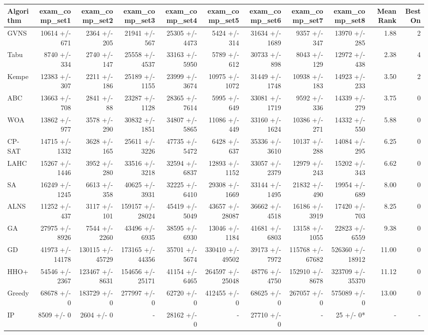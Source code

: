 \begin{tabular}{lrrrrrrrrrr}
\toprule
Algorithm & exam\_comp\_set1 & exam\_comp\_set2 & exam\_comp\_set3 & exam\_comp\_set4 & exam\_comp\_set5 & exam\_comp\_set6 & exam\_comp\_set7 & exam\_comp\_set8 & Mean Rank & Best On \\
\midrule
GVNS & 10614 +/- 671 & 2364 +/- 205 & 21941 +/- 567 & 25305 +/- 4473 & 5424 +/- 314 & 31634 +/- 1689 & 9357 +/- 347 & 13970 +/- 285 & 1.88 & 2 \\
Tabu & 8740 +/- 334 & 2740 +/- 147 & 25558 +/- 4537 & 33163 +/- 5950 & 5789 +/- 612 & 30733 +/- 898 & 8043 +/- 129 & 12972 +/- 438 & 2.38 & 4 \\
Kempe & 12383 +/- 307 & 2211 +/- 186 & 25189 +/- 1155 & 23999 +/- 3674 & 10975 +/- 1072 & 31449 +/- 1748 & 10938 +/- 183 & 14923 +/- 233 & 3.50 & 2 \\
ABC & 13663 +/- 708 & 2841 +/- 88 & 23287 +/- 1128 & 28365 +/- 7614 & 5995 +/- 649 & 33081 +/- 1719 & 9592 +/- 336 & 14339 +/- 279 & 3.75 & 0 \\
WOA & 13862 +/- 977 & 3578 +/- 290 & 30832 +/- 1851 & 34807 +/- 5865 & 11086 +/- 449 & 33160 +/- 1624 & 10386 +/- 271 & 14332 +/- 550 & 5.88 & 0 \\
CP-SAT & 14715 +/- 1332 & 3628 +/- 165 & 25611 +/- 3226 & 47735 +/- 5472 & 6428 +/- 637 & 35336 +/- 3610 & 10137 +/- 288 & 14084 +/- 295 & 6.25 & 0 \\
LAHC & 15267 +/- 1446 & 3952 +/- 280 & 33516 +/- 3218 & 32594 +/- 6837 & 12893 +/- 1152 & 33057 +/- 2379 & 12979 +/- 243 & 15202 +/- 343 & 6.62 & 0 \\
SA & 16249 +/- 1245 & 6613 +/- 358 & 40625 +/- 3931 & 32225 +/- 6410 & 29308 +/- 1669 & 33144 +/- 1495 & 21832 +/- 490 & 19954 +/- 689 & 8.00 & 0 \\
ALNS & 11252 +/- 437 & 3117 +/- 101 & 159157 +/- 28024 & 45419 +/- 5049 & 43657 +/- 28087 & 36662 +/- 4518 & 16186 +/- 3919 & 17420 +/- 703 & 8.25 & 0 \\
GA & 27975 +/- 8926 & 7544 +/- 2260 & 43496 +/- 6935 & 38595 +/- 6930 & 13046 +/- 1184 & 41681 +/- 6803 & 13158 +/- 1055 & 22823 +/- 6559 & 9.38 & 0 \\
GD & 41973 +/- 14178 & 130115 +/- 45729 & 173165 +/- 44356 & 35701 +/- 5674 & 330410 +/- 49502 & 39173 +/- 7972 & 115768 +/- 67682 & 526360 +/- 18912 & 11.00 & 0 \\
HHO+ & 54546 +/- 2367 & 123467 +/- 8631 & 154656 +/- 25171 & 41154 +/- 6465 & 264597 +/- 25048 & 48776 +/- 4750 & 152910 +/- 8678 & 323709 +/- 35370 & 11.12 & 0 \\
Greedy & 68678 +/- 0 & 183729 +/- 0 & 277997 +/- 0 & 62720 +/- 0 & 412455 +/- 0 & 68625 +/- 0 & 267057 +/- 0 & 575089 +/- 0 & 13.00 & 0 \\
IP & 8509 +/- 0 & 2604 +/- 0 & - & 28162 +/- 0 & - & 27710 +/- 0 & - & 25 +/- 0* & - & - \\
\bottomrule
\end{tabular}
